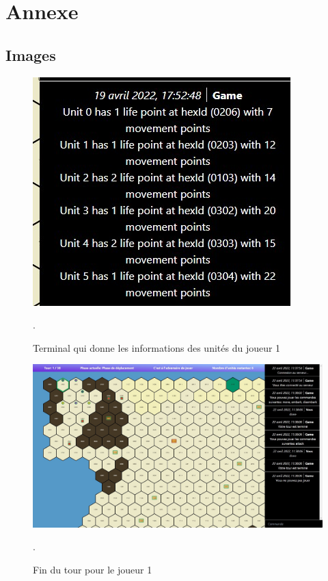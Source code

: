 \section{Annexe}

\subsection{Images}
\begin{figure}[H]
    \centering
    \includegraphics[scale=0.6]{data/info_units.jpg}
    \caption{Terminal qui donne les informations des unités du joueur 1 }.
    \label{fig:units_command}
\end{figure}

\begin{figure}[H]
    \centering
    \includegraphics[scale=0.35]{data/fin_tour.jpg}
    \caption{Fin du tour pour le joueur 1}.
    \label{fig:fin_tour}
\end{figure}




